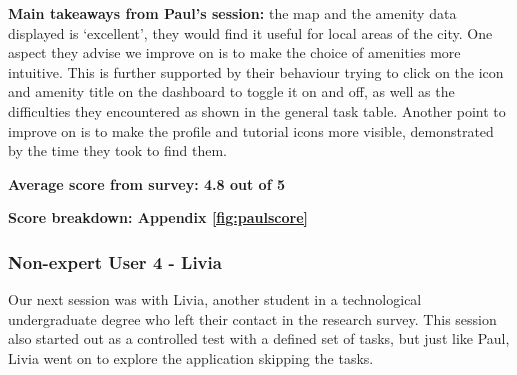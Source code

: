 \textbf{Main takeaways from Paul's session: }the map and the amenity data
displayed is `excellent', they would find it useful for local areas of the city.
One aspect they advise we improve on is to make the choice of amenities more
intuitive. This is further supported by their behaviour trying to click on the
icon and amenity title on the dashboard to toggle it on and off, as well as the
difficulties they encountered as shown in the general task table. Another point
to improve on is to make the profile and tutorial icons more visible,
demonstrated by the time they took to find them.

\textbf{Average score from survey: 4.8 out of 5}

\hspace{2em}\textbf{Score breakdown: Appendix \ref{fig:paulscore}}

\newpage{}

\subsubsection{Non-expert User 4 - Livia}
Our next session was with Livia, another student in a technological
undergraduate degree  who left their contact in the research survey. This
session also started out as a controlled test with a defined set of tasks, but
just like Paul, Livia went on to explore the application skipping the tasks.

